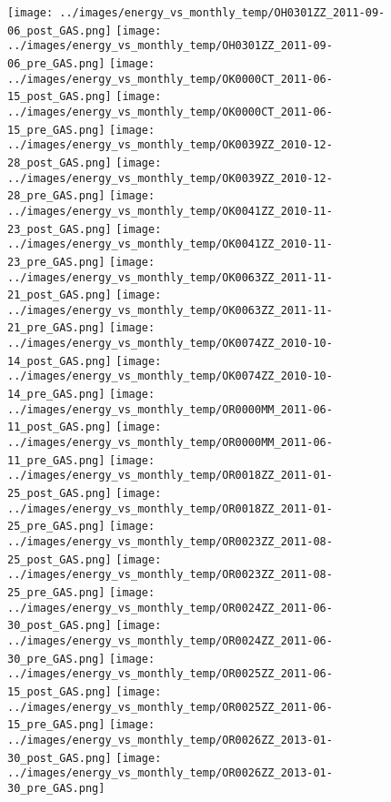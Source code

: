 \clearpage
\begin{figure}
\centering
\texttt{[image: ../images/energy\_vs\_monthly\_temp/OH0301ZZ\_2011-09-06\_post\_GAS.png]}
\texttt{[image: ../images/energy\_vs\_monthly\_temp/OH0301ZZ\_2011-09-06\_pre\_GAS.png]}
\texttt{[image: ../images/energy\_vs\_monthly\_temp/OK0000CT\_2011-06-15\_post\_GAS.png]}
\texttt{[image: ../images/energy\_vs\_monthly\_temp/OK0000CT\_2011-06-15\_pre\_GAS.png]}
\texttt{[image: ../images/energy\_vs\_monthly\_temp/OK0039ZZ\_2010-12-28\_post\_GAS.png]}
\texttt{[image: ../images/energy\_vs\_monthly\_temp/OK0039ZZ\_2010-12-28\_pre\_GAS.png]}
\texttt{[image: ../images/energy\_vs\_monthly\_temp/OK0041ZZ\_2010-11-23\_post\_GAS.png]}
\texttt{[image: ../images/energy\_vs\_monthly\_temp/OK0041ZZ\_2010-11-23\_pre\_GAS.png]}
\texttt{[image: ../images/energy\_vs\_monthly\_temp/OK0063ZZ\_2011-11-21\_post\_GAS.png]}
\texttt{[image: ../images/energy\_vs\_monthly\_temp/OK0063ZZ\_2011-11-21\_pre\_GAS.png]}
\texttt{[image: ../images/energy\_vs\_monthly\_temp/OK0074ZZ\_2010-10-14\_post\_GAS.png]}
\texttt{[image: ../images/energy\_vs\_monthly\_temp/OK0074ZZ\_2010-10-14\_pre\_GAS.png]}
\texttt{[image: ../images/energy\_vs\_monthly\_temp/OR0000MM\_2011-06-11\_post\_GAS.png]}
\texttt{[image: ../images/energy\_vs\_monthly\_temp/OR0000MM\_2011-06-11\_pre\_GAS.png]}
\texttt{[image: ../images/energy\_vs\_monthly\_temp/OR0018ZZ\_2011-01-25\_post\_GAS.png]}
\texttt{[image: ../images/energy\_vs\_monthly\_temp/OR0018ZZ\_2011-01-25\_pre\_GAS.png]}
\texttt{[image: ../images/energy\_vs\_monthly\_temp/OR0023ZZ\_2011-08-25\_post\_GAS.png]}
\texttt{[image: ../images/energy\_vs\_monthly\_temp/OR0023ZZ\_2011-08-25\_pre\_GAS.png]}
\texttt{[image: ../images/energy\_vs\_monthly\_temp/OR0024ZZ\_2011-06-30\_post\_GAS.png]}
\texttt{[image: ../images/energy\_vs\_monthly\_temp/OR0024ZZ\_2011-06-30\_pre\_GAS.png]}
\texttt{[image: ../images/energy\_vs\_monthly\_temp/OR0025ZZ\_2011-06-15\_post\_GAS.png]}
\texttt{[image: ../images/energy\_vs\_monthly\_temp/OR0025ZZ\_2011-06-15\_pre\_GAS.png]}
\texttt{[image: ../images/energy\_vs\_monthly\_temp/OR0026ZZ\_2013-01-30\_post\_GAS.png]}
\texttt{[image: ../images/energy\_vs\_monthly\_temp/OR0026ZZ\_2013-01-30\_pre\_GAS.png]}
\end{figure}
